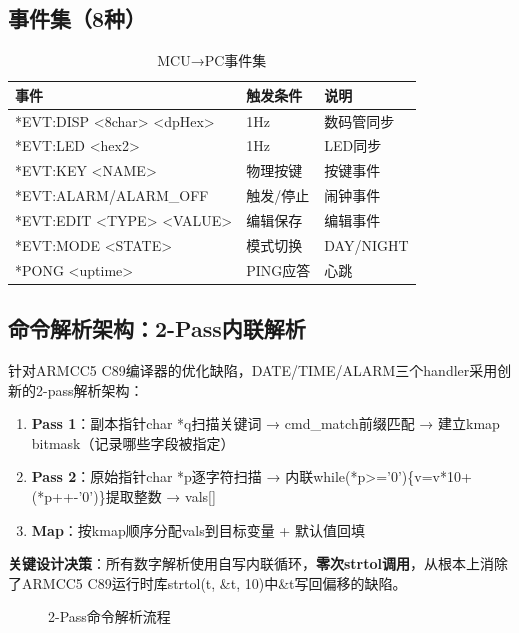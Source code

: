 \documentclass[12pt,hyperref,a4paper,UTF8]{ctexart}
\begin{document}
\subsection{事件集（8种）}

\begin{table}[!htbp]
    \centering
    \begin{tabular}{l|l|l}
    \hline
    \textbf{事件} & \textbf{触发条件} & \textbf{说明} \\
    \hline
    *EVT:DISP <8char> <dpHex> & 1Hz & 数码管同步 \\
    *EVT:LED <hex2> & 1Hz & LED同步 \\
    *EVT:KEY <NAME> & 物理按键 & 按键事件 \\
    *EVT:ALARM/ALARM\_OFF & 触发/停止 & 闹钟事件 \\
    *EVT:EDIT <TYPE> <VALUE> & 编辑保存 & 编辑事件 \\
    *EVT:MODE <STATE> & 模式切换 & DAY/NIGHT \\
    *PONG <uptime> & PING应答 & 心跳 \\
    \hline
    \end{tabular}
    \caption{MCU→PC事件集}
\end{table}

\subsection{命令解析架构：2-Pass内联解析}

针对ARMCC5 C89编译器的优化缺陷，DATE/TIME/ALARM三个handler采用创新的2-pass解析架构：

\begin{enumerate}
    \item \textbf{Pass 1}：副本指针char *q扫描关键词 → cmd\_match前缀匹配 → 建立kmap bitmask（记录哪些字段被指定）
    \item \textbf{Pass 2}：原始指针char *p逐字符扫描 → 内联while(*p>='0')\{v=v*10+(*p++-'0')\}提取整数 → vals[]
    \item \textbf{Map}：按kmap顺序分配vals到目标变量 + 默认值回填
\end{enumerate}

\textbf{关键设计决策}：所有数字解析使用自写内联循环，\textbf{零次strtol调用}，从根本上消除了ARMCC5 C89运行时库strtol(t, \&t, 10)中\&t写回偏移的缺陷。

\begin{figure}[!htbp]
    \centering
    \caption{2-Pass命令解析流程}
    \label{fig:parse}
\end{figure}
\end{document}
